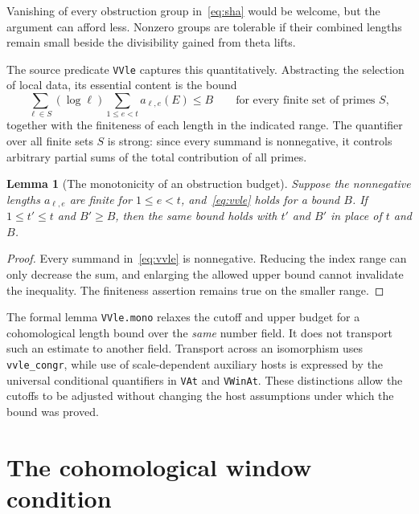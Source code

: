\documentclass[11pt,openany,oneside]{scrbook}
\newtheorem{lemma}[theorem]{Lemma}
\theoremstyle{definition}
\theoremstyle{remark}
\begin{document}
Vanishing of every obstruction group in~\eqref{eq:sha} would be welcome, but the argument can afford less. Nonzero groups are tolerable if their combined lengths remain small beside the divisibility gained from theta lifts.

The source predicate \texttt{VVle} captures this quantitatively. Abstracting the selection of local data, its essential content is the bound
\begin{equation}\label{eq:vvle}
\sum_{\ell\in S}(\log\ell)
\sum_{1\le e<t}a_{\ell,e}(E)\le B
\qquad\text{for every finite set of primes }S,
\end{equation}
together with the finiteness of each length in the indicated range. The quantifier over all finite sets $S$ is strong: since every summand is nonnegative, it controls arbitrary partial sums of the total contribution of all primes.

\begin{lemma}[The monotonicity of an obstruction budget]\label{lem:vvmono}
Suppose the nonnegative lengths $a_{\ell,e}$ are finite for $1\le e<t$, and~\eqref{eq:vvle} holds for a bound $B$. If $1\le t'\le t$ and $B'\ge B$, then the same bound holds with $t'$ and $B'$ in place of $t$ and $B$.
\end{lemma}
\begin{proof}
Every summand in~\eqref{eq:vvle} is nonnegative. Reducing the index range can only decrease the sum, and enlarging the allowed upper bound cannot invalidate the inequality. The finiteness assertion remains true on the smaller range.
\end{proof}

The formal lemma \texttt{VVle.mono} relaxes the cutoff and upper budget for a cohomological length bound over the \emph{same} number field. It does not transport such an estimate to another field. Transport across an isomorphism uses \texttt{vvle\_congr}, while use of scale-dependent auxiliary hosts is expressed by the universal conditional quantifiers in \texttt{VAt} and \texttt{VWinAt}. These distinctions allow the cutoffs to be adjusted without changing the host assumptions under which the bound was proved.

\section{The cohomological window condition}
\end{document}
